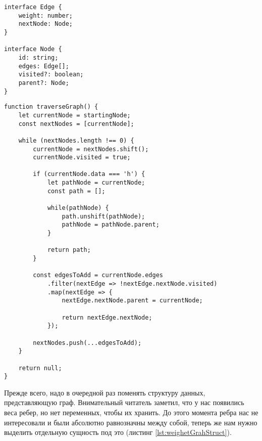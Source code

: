 \documentclass[../../article.tex]{subfiles}
\begin{document}
\begin{ruledelement}
        \begin{lstlisting}[caption={Структура для взвешенного графа}, label={lst:weighetGrahStruct}]
interface Edge {
    weight: number;
    nextNode: Node;
}

interface Node {
    id: string;
    edges: Edge[];
    visited?: boolean;
    parent?: Node;
}
    \end{lstlisting}
\end{ruledelement}

\begin{figure*}
    \begin{ruledelement}
        \begin{lstlisting}[caption={Поиск пути при обходе взвешенного графа в ширину}, label={lst:bfsWeightedRandomPath}]
function traverseGraph() {
    let currentNode = startingNode;
    const nextNodes = [currentNode];

    while (nextNodes.length !== 0) {
        currentNode = nextNodes.shift();
        currentNode.visited = true;

        if (currentNode.data === 'h') {
            let pathNode = currentNode;
            const path = [];

            while(pathNode) {
                path.unshift(pathNode);
                pathNode = pathNode.parent;
            }

            return path;
        }

        const edgesToAdd = currentNode.edges
            .filter(nextEdge => !nextEdge.nextNode.visited)
            .map(nextEdge => {
                nextEdge.nextNode.parent = currentNode;

                return nextEdge.nextNode;
            });

        nextNodes.push(...edgesToAdd);
    }

    return null;
}
        \end{lstlisting}
    \end{ruledelement}

\end{figure*}

Прежде всего, надо в очередной раз поменять структуру данных, представляющую граф. Внимательный читатель заметил, что у нас появились веса ребер, но нет переменных, чтобы их хранить. До этого момента ребра нас не интересовали и были абсолютно равнозначны между собой, теперь же нам нужно выделить отдельную сущность под это (листинг \ref{lst:weighetGrahStruct}).
\end{document}
